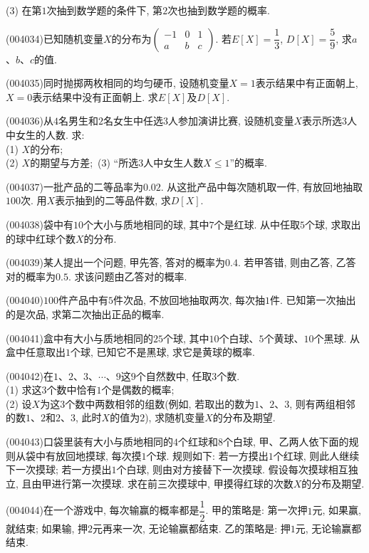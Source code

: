 (3) 在第$1$次抽到数学题的条件下, 第$2$次也抽到数学题的概率.
\item (004034)已知随机变量$X$的分布为$\begin{pmatrix} -1 & 0 & 1 \\ a & b & c\end{pmatrix}$. 若$E[X]=\dfrac 13$, $D[X]=\dfrac 59$, 求$a$、$b$、$c$的值.
\item (004035)同时抛掷两枚相同的均匀硬币, 设随机变量$X=1$表示结果中有正面朝上, $X=0$表示结果中没有正面朝上. 求$E[X]$及$D[X]$.
\item (004036)从$4$名男生和$2$名女生中任选$3$人参加演讲比赛, 设随机变量$X$表示所选$3$人中女生的人数. 求:\\
(1) $X$的分布;\\
(2) $X$的期望与方差;\
(3) ``所选$3$人中女生人数$X\le 1$''的概率.
\item (004037)一批产品的二等品率为$0.02$. 从这批产品中每次随机取一件, 有放回地抽取$100$次. 用$X$表示抽到的二等品件数, 求$D[X]$.
\item (004038)袋中有$10$个大小与质地相同的球, 其中$7$个是红球. 从中任取$5$个球, 求取出的球中红球个数$X$的分布.
\item (004039)某人提出一个问题, 甲先答, 答对的概率为$0.4$. 若甲答错, 则由乙答, 乙答对的概率为$0.5$. 求该问题由乙答对的概率.
\item (004040)$100$件产品中有$5$件次品, 不放回地抽取两次, 每次抽$1$件. 已知第一次抽出的是次品, 求第二次抽出正品的概率.
\item (004041)盒中有大小与质地相同的$25$个球, 其中$10$个白球、$5$个黄球、$10$个黑球. 从盒中任意取出$1$个球, 已知它不是黑球, 求它是黄球的概率.
\item (004042)在$1$、$2$、$3$、$\cdots$、$9$这$9$个自然数中, 任取$3$个数.\\
(1) 求这$3$个数中恰有$1$个是偶数的概率;\\
(2) 设$X$为这$3$个数中两数相邻的组数(例如, 若取出的数为$1$、$2$、$3$, 则有两组相邻的数$1$、$2$和$2$、$3$, 此时$X$的值为$2$), 求随机变量$X$的分布及期望.
\item (004043)口袋里装有大小与质地相同的$4$个红球和$8$个白球, 甲、乙两人依下面的规则从袋中有放回地摸球, 每次摸$1$个球. 规则如下: 若一方摸出$1$个红球, 则此人继续下一次摸球; 若一方摸出$1$个白球, 则由对方接替下一次摸球. 假设每次摸球相互独立, 且由甲进行第一次摸球. 求在前三次摸球中, 甲摸得红球的次数$X$的分布及期望.
\item (004044)在一个游戏中, 每次输赢的概率都是$\dfrac 12$. 甲的策略是: 第一次押$1$元, 如果赢, 就结束; 如果输, 押$2$元再来一次, 无论输赢都结束. 乙的策略是: 押$1$元, 无论输赢都结束.\\
